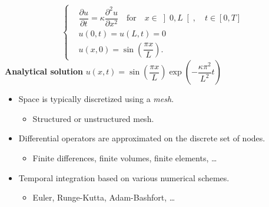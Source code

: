 \documentclass[aspectratio=169,compress,12pt,dvipsnames]{beamer}
\newcommand{\stencilpt}[4][]{\node[circle,fill=blue!60,draw=black,scale=0.5,label={below:#4},#1] at (#2) (#3) {}}
\begin{document}
\begin{frame}
  \vfill
  \centering
  \[
    \left\{
      \begin{aligned}
        & \dfrac{\partial u}{\partial t} = \kappa \dfrac{\partial^2 u}{\partial x^2} \quad \text{for} \quad x \in \left]0, L\right[, \quad  t \in \left[0, T \right]  \\
        & u(0, t) = u(L, t) = 0 \\
        & u(x, 0) = \sin \left( \dfrac{\pi x}{L} \right).
      \end{aligned}
      \right.
    \]
    \vfill
    \textbf{Analytical solution}  \hspace{1em}  \(  u(x, t) = \sin \left( \dfrac{\pi x}{L} \right) \exp \left( -\dfrac{\kappa \pi^2}{L^2} t \right) \)
    \vfill
\end{frame}

\begin{frame}
  \vfill
  \begin{minipage}{.38\textwidth}
    \centering
  \end{minipage}%
  \hfill
  \begin{minipage}{.58\textwidth}
    \begin{itemize}
      \item Space is typically discretized using a \emph{mesh}.
        \begin{itemize}
          \item Structured or unstructured mesh.
        \end{itemize}
        \par
      \item Differential operators are approximated on the discrete set of nodes.
        \begin{itemize}
          \item Finite differences, finite volumes, finite elements, \ldots
        \end{itemize}
        \par
      \item Temporal integration based on various numerical schemes.
        \begin{itemize}
          \item Euler, Runge-Kutta, Adam-Bashfort, \ldots
        \end{itemize}
    \end{itemize}
  \end{minipage}
  \vfill
\end{frame}
\end{document}
